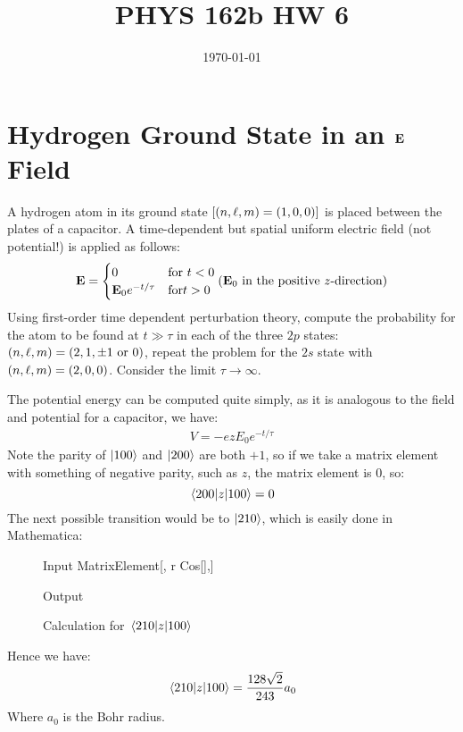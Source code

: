 \documentclass[12pt]{article}
\title{\vspace{-3em}PHYS 162b HW 6}
\date{\today}
\begin{document}
\maketitle
\section{Hydrogen Ground State in an $\vb{E}$ Field}
\begin{problem}
  A hydrogen atom in its ground state $[(n,\ell,m)=(1,0,0)]$ is placed between the plates of a capacitor. A time-dependent but spatial uniform electric field (not potential!) is applied as follows:
  \begin{align*}
    \vb{E}=
    \begin{cases}
      0 & \text{for }t<0\\
      \vb{E}_0e^{-t/\tau} & \text{for} t>0
    \end{cases}
    (\vb{E}_0\text{ in the positive $z$-direction})
  \end{align*}
  Using first-order time dependent perturbation theory, compute the probability for the atom to be found at $t\gg\tau$ in each of the three $2p$ states: $(n,\ell,m)=(2,1,\pm1\text{ or }0)$, repeat the problem for the $2s$ state with $(n,\ell,m)=(2,0,0)$. Consider the limit $\tau\to\infty$.
\end{problem}

The potential energy can be computed quite simply, as it is analogous to the field and potential for a capacitor, we have:
\begin{align*}
  V=-ezE_0e^{-t/\tau}
\end{align*}
Note the parity of $\ket{100}$ and $\ket{200}$ are both $+1$, so if we take a matrix element with something of negative parity, such as $z$, the matrix element is 0, so:
\begin{equation}
  \label{eq:1}
  \mel{200}{z}{100}=0
\end{equation}
The next possible transition would be to $\ket{210}$, which is easily done in Mathematica:
\begin{figure}[H]
  \centering
  \begin{mmaCell}[moredefined={MatrixElement}]{Input}
MatrixElement[, r Cos[\mmaUnd{\(\pmb{\theta}\)}],]
  \end{mmaCell}
  \begin{mmaCell}{Output}
  \end{mmaCell}
    \caption{Calculation for $\mel{210}{z}{100}$}
\end{figure}
Hence we have:
\begin{align*}
  \mel{210}{z}{100}=\frac{128\sqrt{2}}{243}a_0  
\end{align*}
Where $a_0$ is the Bohr radius.
\end{document}
